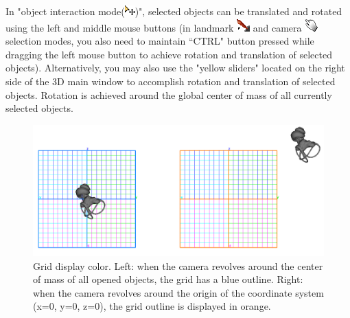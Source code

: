 \documentclass[12pt, a4paper]{book}
\begin{document}
In "object interaction mode(\includegraphics[scale=0.7]{../images/04/move_mode.png})", selected objects can be translated and rotated using the left and middle mouse buttons (in landmark \includegraphics[scale=0.7]{../images/04/Landmarks2.png} and camera  \includegraphics[scale=0.7]{../images/04/camera_mode.png} selection modes, you also need to maintain ``CTRL" button pressed while dragging the left mouse button to achieve rotation and translation of selected objects). Alternatively, you may also use the "yellow sliders" located on the right side of the 3D main window to accomplish rotation and translation of selected objects. Rotation is achieved around the global center of mass of all currently selected objects.\\
\begin{figure}
  \centering
  \includegraphics[scale=0.3]{grid.png} 
	\caption{Grid display color.  Left: when the camera revolves around the center of mass of all opened objects, the grid has a blue outline. Right: when the camera revolves around the origin of the coordinate system (x=0, y=0, z=0), the grid outline is displayed in orange.}
\label{grid_color}
 
\end{figure}
\end{document}
